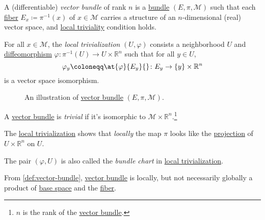 \begin{definition}\label{def:vector-bundle}
	A (differentiable) \emph{vector bundle} of rank \(n\) is a \hyperref[def:bundle]{bundle} \((E, \pi , \mathcal{M} )\) such that each \hyperref[def:fiber]{fiber} \(E_x\coloneqq \pi ^{-1} (x)\) of \(x\in \mathcal{M} \) carries a structure of an \(n\)-dimensional (real) vector space, and \hyperref[def:local-trivialization]{local triviality} condition holds.

	\begin{definition}\label{def:local-trivialization}
		For all \(x\in \mathcal{M} \), the \emph{local trivialization} \((U, \varphi )\) consists a neighborhood \(U\) and \hyperref[def:diffeomorphism]{diffeomorphism} \(\varphi \colon \pi ^{-1} (U) \to U\times \mathbb{R} ^n\) such that for all \(y\in U\),
		\[
			\varphi _y \coloneqq \at{\varphi }{E_y}{} \colon E_y \to \left\{ y \right\} \times \mathbb{R} ^n
		\]
		is a vector space isomorphism.
	\end{definition}
\end{definition}

\begin{figure}[H]
	\centering
	\caption{An illustration of \hyperref[def:vector-bundle]{vector bundle} \((E, \pi , \mathcal{M} )\).}
	\label{fig:vector-bundle}
\end{figure}

\begin{definition}[Trivial]\label{def:trivial}
	A \hyperref[def:vector-bundle]{vector bundle} is \emph{trivial} if it's isomorphic to \(\mathcal{M} \times \mathbb{R} ^n\).\footnote{\(n\) is the rank of the \hyperref[def:vector-bundle]{vector bundle}.}
\end{definition}

\begin{intuition}
	The \hyperref[def:local-trivialization]{local trivialization} shows that \emph{locally} the map \(\pi \) looks like the \hyperref[def:bundle-projection]{projection} of \(U\times \mathbb{R} ^n\) on \(U\).
\end{intuition}

\begin{definition}\label{def:bundle-chart}
	The pair \((\varphi , U)\) is also called the \emph{bundle chart} in \hyperref[def:local-trivialization]{local trivialization}.
\end{definition}

\begin{remark}
	From \autoref{def:vector-bundle}, \hyperref[def:vector-bundle]{vector bundle} is locally, but not necessarily globally a product of \hyperref[def:base-space]{base space} and the \hyperref[def:fiber]{fiber}.
\end{remark}

